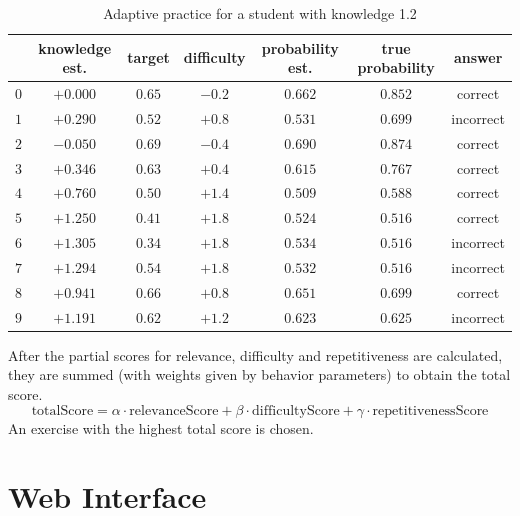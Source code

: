 \documentclass[12pt, twoside]{fithesis2}		%
\renewcommand{\_}{\leavevmode \kern0.07em\vbox{\hrule width0.4em}}
\begin{document}
\begin{table}[h]
\begin{center}
\begin{tabular}{| c | c | c | c | c | c | c |}
  \hline
  & knowledge est. &  target & difficulty & probability est. & true probability & answer\\
  \hline
  $0$ & $+0.000$ & $0.65$ & $-0.2$ & $0.662$ & $0.852$ &  correct   \\
  $1$ & $+0.290$ & $0.52$ & $+0.8$ & $0.531$ & $0.699$ &  incorrect \\
  $2$ & $-0.050$ & $0.69$ & $-0.4$ & $0.690$ & $0.874$ &  correct   \\
  $3$ & $+0.346$ & $0.63$ & $+0.4$ & $0.615$ & $0.767$ &  correct   \\
  $4$ & $+0.760$ & $0.50$ & $+1.4$ & $0.509$ & $0.588$ &  correct   \\
  $5$ & $+1.250$ & $0.41$ & $+1.8$ & $0.524$ & $0.516$ &  correct   \\
  $6$ & $+1.305$ & $0.34$ & $+1.8$ & $0.534$ & $0.516$ &  incorrect \\
  $7$ & $+1.294$ & $0.54$ & $+1.8$ & $0.532$ & $0.516$ &  incorrect \\
  $8$ & $+0.941$ & $0.66$ & $+0.8$ & $0.651$ & $0.699$ &  correct   \\
  $9$ & $+1.191$ & $0.62$ & $+1.2$ & $0.623$ & $0.625$ &  incorrect \\
  \hline
\end{tabular}
\end{center}
\caption{Adaptive practice for a student with knowledge 1.2}
\label{tbl:practice-example}
\end{table}


After the partial scores for relevance, difficulty and repetitiveness are calculated,
they are summed (with weights given by behavior parameters) to obtain the total score.
$$
\text{totalScore} = \alpha \cdot \text{relevanceScore} + \beta \cdot \text{difficultyScore} + \gamma \cdot \text{repetitivenessScore}
$$
An exercise with the highest total score is chosen.





\section{Web Interface}
\label{sec:smartoo-web}
\end{document}
